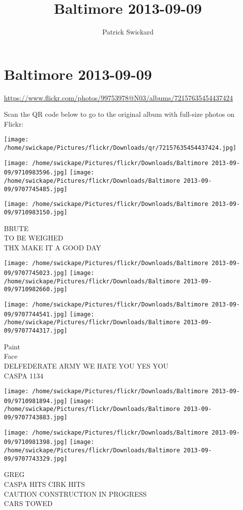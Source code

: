 \documentclass[10pt,letterpaper]{article}
\title{Baltimore 2013-09-09}
\author{Patrick Swickard}
\date{}
\begin{document}
\section*{Baltimore 2013-09-09}

\url{https://www.flickr.com/photos/99753978@N03/albums/72157635454437424}

Scan the QR code below to go to the original album with full-size photos on Flickr:

\texttt{[image: /home/swickape/Pictures/flickr/Downloads/qr/72157635454437424.jpg]}
\pagebreak

\texttt{[image: /home/swickape/Pictures/flickr/Downloads/Baltimore 2013-09-09/9710983596.jpg]}
\texttt{[image: /home/swickape/Pictures/flickr/Downloads/Baltimore 2013-09-09/9707745485.jpg]}

\vspace{0.25in}
\texttt{[image: /home/swickape/Pictures/flickr/Downloads/Baltimore 2013-09-09/9710983150.jpg]}

BRUTE\\
TO BE WEIGHED\\
THX MAKE IT A GOOD DAY
\pagebreak

\texttt{[image: /home/swickape/Pictures/flickr/Downloads/Baltimore 2013-09-09/9707745023.jpg]}
\texttt{[image: /home/swickape/Pictures/flickr/Downloads/Baltimore 2013-09-09/9710982660.jpg]}

\texttt{[image: /home/swickape/Pictures/flickr/Downloads/Baltimore 2013-09-09/9707744541.jpg]}
\texttt{[image: /home/swickape/Pictures/flickr/Downloads/Baltimore 2013-09-09/9707744317.jpg]}

Paint\\
Face\\
DELFEDERATE ARMY WE HATE YOU YES YOU\\
CASPA 1134
\pagebreak

\texttt{[image: /home/swickape/Pictures/flickr/Downloads/Baltimore 2013-09-09/9710981894.jpg]}
\texttt{[image: /home/swickape/Pictures/flickr/Downloads/Baltimore 2013-09-09/9707743883.jpg]}

\texttt{[image: /home/swickape/Pictures/flickr/Downloads/Baltimore 2013-09-09/9710981398.jpg]}
\texttt{[image: /home/swickape/Pictures/flickr/Downloads/Baltimore 2013-09-09/9707743329.jpg]}

GREG\\
CASPA HITS CIRK HITS\\
CAUTION CONSTRUCTION IN PROGRESS\\
CARS TOWED
\pagebreak
\end{document}
